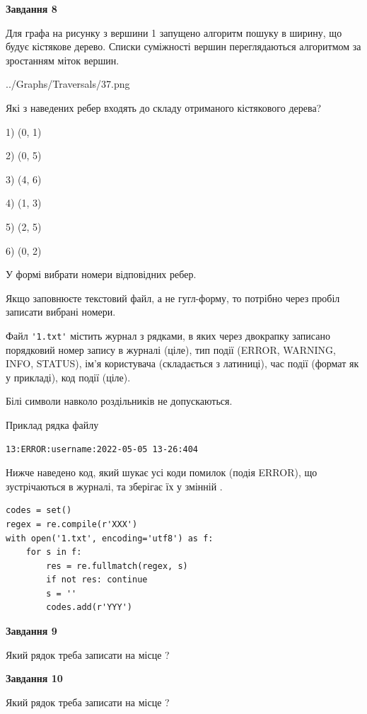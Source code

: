 \documentclass[12pt, ukrainian]{article}
\def\code#1{\Verb!#1!}
\begin{document}
{\begin {large}
{\begin {center}\textbf{Завдання 8}\end {center}}\par
Для графа на рисунку з вершини 1 запущено алгоритм пошуку в ширину, що будує кістякове дерево. Списки суміжності вершин переглядаються алгоритмом за зростанням міток вершин.\par
\begin{center}
	{../Graphs/Traversals/37.png}
\end{center}
\par Які з наведених ребер входять до складу отриманого кістякового дерева?\par
1) (0, 1)\par
2) (0, 5)\par
3) (4, 6)\par
4) (1, 3)\par
5) (2, 5)\par
6) (0, 2)\par
{\vskip 15pt} У формі вибрати номери відповідних ребер.


Якщо заповнюєте текстовий файл, а не гугл-форму, то потрібно через пробіл записа\-ти вибрані номери.\par
\newpage


Файл \code{'1.txt'} містить журнал з рядками, в яких через двокрапку записано поряд\-ко\-вий номер запису в журналі (ціле), тип події (ERROR, WARNING, INFO, STATUS), ім'я користувача (складається з латиниці), час події (фор\-мат як у прикладі), код події (ціле).

Білі символи навколо роздільників не допускаються.

Приклад рядка файлу



\begin{verbatim}
13:ERROR:username:2022-05-05 13-26:404
\end{verbatim}


Нижче наведено код, який шукає усі коди помилок (подія ERROR), що зустріча\-ють\-ся в журналі, та зберігає їх у змінній .



\begin{verbatim}
codes = set()
regex = re.compile(r'XXX')
with open('1.txt', encoding='utf8') as f:
    for s in f:
        res = re.fullmatch(regex, s)
        if not res: continue
        s = ''
        codes.add(r'YYY')
\end{verbatim}


{\begin {center}\textbf{Завдання 9}\end {center}}\par
Який рядок треба записати на місце  ?\par
\vspace{5mm}


{\begin {center}\textbf{Завдання 10}\end {center}}\par
Який рядок треба записати на місце  ?\par


\newpage


\end {large}}
\end{document}
